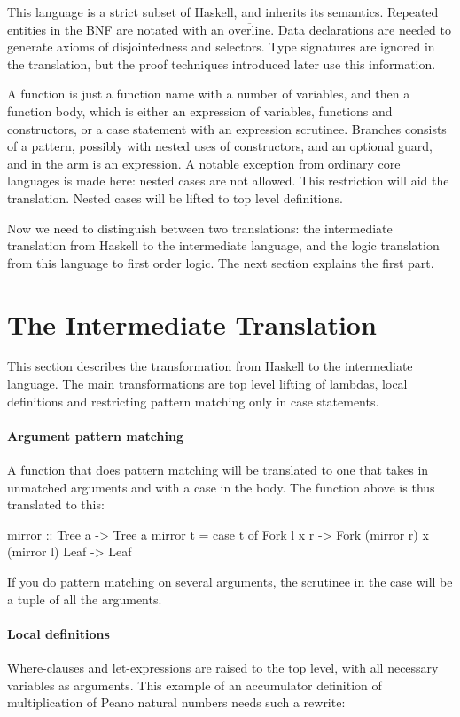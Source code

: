 This language is a strict subset of Haskell, and inherits its
semantics.  Repeated entities in the BNF are notated with an
$\overline{\text{overline}}$.  Data declarations are needed to
generate axioms of disjointedness and selectors. Type signatures are
ignored in the translation, but the proof techniques introduced later
use this information.

A function is just a function name with a number of variables, and
then a function body, which is either an expression of variables,
functions and constructors, or a case statement with an expression
scrutinee. Branches consists of a pattern, possibly with nested uses
of constructors, and an optional guard, and in the arm is an
expression. A notable exception from ordinary core languages is made
here: nested cases are not allowed. This restriction will aid the
translation. Nested cases will be lifted to top level definitions.

Now we need to distinguish between two translations: the intermediate
translation from Haskell to the intermediate language, and the logic
translation from this language to first order logic. The next section
explains the first part.

\section{The Intermediate Translation}

This section describes the transformation from Haskell to the
intermediate language. The main transformations are top level lifting
of lambdas, local definitions and restricting pattern matching only in
case statements.

\paragraph{Argument pattern matching} A function that does pattern matching will be translated to one that
takes in unmatched arguments and with a case in the body. The
 function above is thus translated to this:

\begin{code}
mirror :: Tree a -> Tree a
mirror t = case t of
   Fork l x r -> Fork (mirror r) x (mirror l)
   Leaf       -> Leaf
\end{code}

\noindent
If you do pattern matching on several arguments, the scrutinee in the
case will be a tuple of all the arguments.

\paragraph{Local definitions} Where-clauses and let-expressions are
raised to the top level, with all necessary variables as
arguments. This example of an accumulator definition of multiplication
of Peano natural numbers needs such a rewrite:

